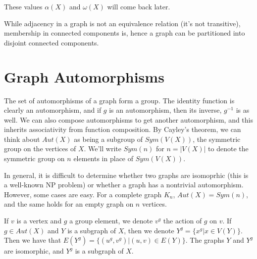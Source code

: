 
These values $\alpha(X)$ and $\omega(X)$ will come back later.


While adjacency in a graph is not an equivalence relation (it's not transitive), membership in connected components is, hence a graph can be partitioned into disjoint connected components.

\section*{Graph Automorphisms}



The set of automorphisms of a graph form a group. The identity function is clearly an automorphism, and if $g$ is an automorphism, then its inverse, $g^{-1}$ is as well.  We can also compose automorphisms to get another automorphism, and this inherits associativity from function composition.  By Cayley's theorem, we can think about $Aut(X)$ as being a subgroup of $Sym(V(X))$, the symmetric group on the vertices of $X$. We'll write $Sym(n)$ for $n=|V(X)|$ to denote the symmetric group on $n$ elements in place of $Sym(V(X))$. 

In general, it is difficult to determine whether two graphs are isomoprhic (this is a well-known NP problem) or whether a graph has a nontrivial automorphism.  However, some cases are easy.  For a complete graph $K_n$, $Aut(X)=Sym(n)$, and the same holds for an empty graph on $n$ vertices.

If $v$ is a vertex and $g$ a group element, we denote $v^g$ the action of $g$ on $v$.  If $g\in Aut(X)$ and $Y$ is a subgraph of $X$, then we denote $Y^g = \{x^g|x\in V(Y)\}$.  Then we have that $E(Y^g) = \{(u^g,v^g)|(u,v)\in E(Y)\}$.  The graphs $Y$ and $Y^g$ are isomorphic, and $Y^g$ is a subgraph of $X$.


